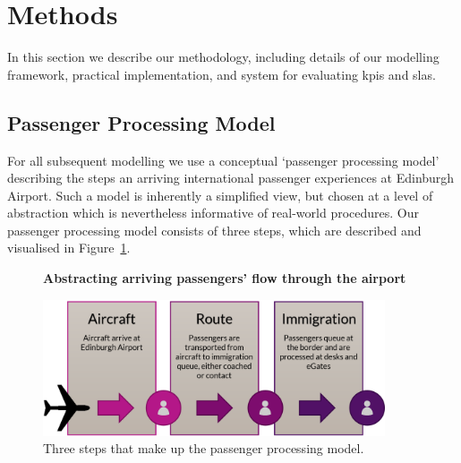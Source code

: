 \documentclass[10pt]{article}
\newcommand*{\figuretitle}[1]{%
    {\centering%
    \textbf{#1}%
    \par\medskip}%
}
\begin{document}
\section{Methods} \label{sec:methods}

In this section we describe our methodology, including details of our modelling framework, practical implementation, and system for evaluating \glspl{kpi} and \glspl{sla}.

\subsection{Passenger Processing Model}

For all subsequent modelling we use a conceptual `passenger processing model' describing the steps an arriving international passenger experiences at Edinburgh Airport. Such a model is inherently a simplified view, but chosen at a level of abstraction which is nevertheless informative of real-world procedures. Our passenger processing model consists of three steps, which are described and visualised in Figure~\ref{fig:PPM_threesteps}.
  

\begin{figure}[!ht]
    \centering
    \figuretitle{Abstracting arriving passengers' flow through the airport}
    \includegraphics[width=0.9\textwidth]{figures/ThreeSteps.png}
     \caption{Three steps that make up the passenger processing model.} \label{fig:PPM_threesteps}
\end{figure}
\end{document}

